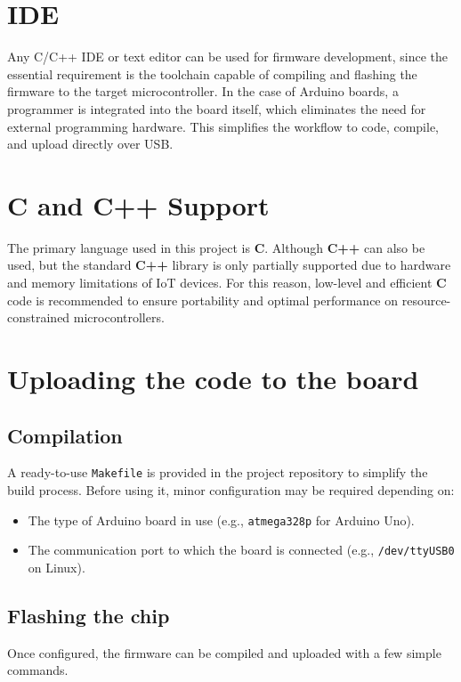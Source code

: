 
\section{IDE}
Any C/C++ IDE or text editor can be used for firmware development, since the essential requirement is the toolchain capable of compiling and flashing the firmware to the target microcontroller.  
In the case of Arduino boards, a programmer is integrated into the board itself, which eliminates the need for external programming hardware. This simplifies the workflow to code, compile, and upload directly over USB.

\section{C and C++ Support}
The primary language used in this project is \textbf{C}.  
Although \textbf{C++} can also be used, but the standard \textbf{C++} library is only partially supported due to hardware and memory limitations of IoT devices.  
For this reason, low-level and efficient \textbf{C} code is recommended to ensure portability and optimal performance on resource-constrained microcontrollers.

\section{Uploading the code to the board}

\subsection{Compilation}
A ready-to-use \texttt{Makefile} is provided in the project repository to simplify the build process.  
Before using it, minor configuration may be required depending on:
\begin{itemize}
    \item The type of Arduino board in use (e.g., \texttt{atmega328p} for Arduino Uno).
    \item The communication port to which the board is connected (e.g., \texttt{/dev/ttyUSB0} on Linux).
\end{itemize}
\newpage
\subsection{Flashing the chip}
Once configured, the firmware can be compiled and uploaded with a few simple commands.  

